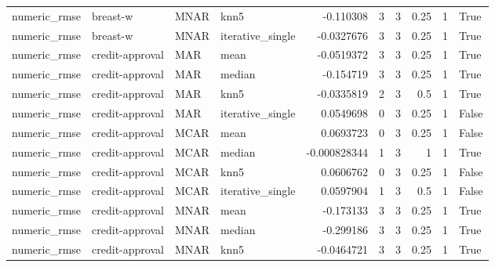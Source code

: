 \begin{table}[ht]
\begin{tabular}{llllrrrrrl}
 numeric\_rmse           & breast-w        & MNAR        & knn5             &     -0.110308    &                   3 &       3 &      0.25 &        1 & True               \\
 numeric\_rmse           & breast-w        & MNAR        & iterative\_single &     -0.0327676   &                   3 &       3 &      0.25 &        1 & True               \\
 numeric\_rmse           & credit-approval & MAR         & mean             &     -0.0519372   &                   3 &       3 &      0.25 &        1 & True               \\
 numeric\_rmse           & credit-approval & MAR         & median           &     -0.154719    &                   3 &       3 &      0.25 &        1 & True               \\
 numeric\_rmse           & credit-approval & MAR         & knn5             &     -0.0335819   &                   2 &       3 &      0.5  &        1 & True               \\
 numeric\_rmse           & credit-approval & MAR         & iterative\_single &      0.0549698   &                   0 &       3 &      0.25 &        1 & False              \\
 numeric\_rmse           & credit-approval & MCAR        & mean             &      0.0693723   &                   0 &       3 &      0.25 &        1 & False              \\
 numeric\_rmse           & credit-approval & MCAR        & median           &     -0.000828344 &                   1 &       3 &      1    &        1 & True               \\
 numeric\_rmse           & credit-approval & MCAR        & knn5             &      0.0606762   &                   0 &       3 &      0.25 &        1 & False              \\
 numeric\_rmse           & credit-approval & MCAR        & iterative\_single &      0.0597904   &                   1 &       3 &      0.5  &        1 & False              \\
 numeric\_rmse           & credit-approval & MNAR        & mean             &     -0.173133    &                   3 &       3 &      0.25 &        1 & True               \\
 numeric\_rmse           & credit-approval & MNAR        & median           &     -0.299186    &                   3 &       3 &      0.25 &        1 & True               \\
 numeric\_rmse           & credit-approval & MNAR        & knn5             &     -0.0464721   &                   3 &       3 &      0.25 &        1 & True               \\

\end{tabular}
\end{table}
